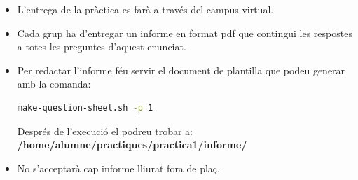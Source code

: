 \documentclass[12pt,a4paper]{article}
\begin{document}
\begin{itemize}
  \item L'entrega de la pràctica es farà a través del campus virtual.
  \item Cada grup ha d'entregar un informe en format pdf que contingui les respostes a totes les preguntes d'aquest enunciat.
  \item Per redactar l'informe féu servir el document de plantilla que podeu generar amb la comanda: 
  \begin{lstlisting}[language=bash]
    make-question-sheet.sh -p 1
   \end{lstlisting}
  Després de l'execució el podreu trobar a: \textbf{/home/alumne/practiques/practica1/informe/}
  \item No s'acceptarà cap informe lliurat fora de plaç.
\end{itemize}



\end{document}
